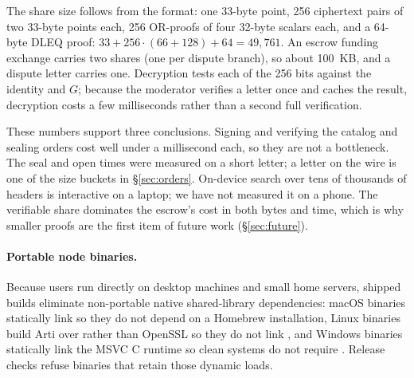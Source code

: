 The share size follows from the format: one 33-byte point, 256 ciphertext pairs of two 33-byte points each, 256 OR-proofs of four 32-byte scalars each, and a 64-byte DLEQ proof: $33+256\cdot(66+128)+64=49{,}761$. An escrow funding exchange carries two shares (one per dispute branch), so about 100~KB, and a dispute letter carries one. Decryption tests each of the 256 bits against the identity and $G$; because the moderator verifies a letter once and caches the result, decryption costs a few milliseconds rather than a second full verification.

These numbers support three conclusions. Signing and verifying the catalog and sealing orders cost well under a millisecond each, so they are not a bottleneck. The seal and open times were measured on a short letter; a letter on the wire is one of the size buckets in \S\ref{sec:orders}. On-device search over tens of thousands of headers is interactive on a laptop; we have not measured it on a phone. The verifiable share dominates the escrow's cost in both bytes and time, which is why smaller proofs are the first item of future work (\S\ref{sec:future}).

\paragraph{Portable node binaries.} Because users run  directly on desktop machines and small home servers, shipped builds eliminate non-portable native shared-library dependencies: macOS binaries statically link  so they do not depend on a Homebrew  installation, Linux binaries build Arti over  rather than OpenSSL so they do not link , and Windows binaries statically link the MSVC C runtime so clean systems do not require . Release checks refuse binaries that retain those dynamic loads.
